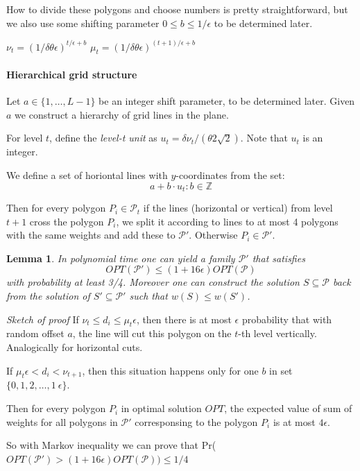 \documentclass[en]{pracamgr}
\newtheorem{lemma}{Lemma}[section]
\begin{document}
How to divide these polygons and choose numbers
is pretty straightforward,
but we also use some shifting parameter $0 \le b \le 1/\epsilon$
to be determined later.

$\nu_t = (1/\delta\theta\epsilon)^{t/\epsilon + b}$
$\mu_t = (1/\delta\theta\epsilon)^{(t+1)/\epsilon + b}$

\paragraph{Hierarchical grid structure}
Let $a \in \{1, \ldots, L - 1\}$ be an integer shift
parameter, to be determined later. Given $a$
we construct a hierarchy of grid lines in the plane.

For level $t$, define the \textit{level-t unit}
as $u_t = \delta \nu_t/(\theta 2\sqrt{2})$.
Note that $u_t$ is an integer.

We define a set of horiontal lines with $y$-coordinates
from the set:
$$a + b \cdot u_t : b \in \mathbb{Z}$$

Then for every polygon $P_i \in \mathcal{P}_t$
if the lines (horizontal or vertical)
from level $t+1$ cross the polygon $P_i$,
we split it according to lines
to at most 4 polygons with the
same weights and add these to $\mathcal{P'}$.
Otherwise $P_i \in \mathcal{P'}$.

\begin{lemma}
In polynomial time one can yield a family $\mathcal{P'}$
that satisfies $$OPT(\mathcal{P'}) \le (1+16\epsilon)OPT(\mathcal{P})$$
with probability at least 3/4.
Moreover one can construct the solution $S \subseteq \mathcal{P}$
back from the solution of $S' \subseteq \mathcal{P'}$
such that $w(S) \le w(S')$.
\end{lemma}

\textit{Sketch of proof}
If $\nu_t \le d_i \le \mu_t\epsilon$, then there is at most
$\epsilon$ probability that with random offset $a$,
the line will cut this polygon on the $t$-th level vertically.
Analogically for horizontal cuts.

If $\mu_t\epsilon < d_i < \nu_{t+1}$, then this situation happens
only for one $b$ in set $\{0, 1, 2, \ldots, 1\ \epsilon\}$.

Then for every polygon $P_i$ in optimal solution $OPT$, the expected value
of sum of weights for all polygons in $\mathcal{P'}$
corresponsing to the polygon $P_i$ is at most $4\epsilon$.

So with Markov inequality we can prove that
Pr($OPT(\mathcal{P'}) > (1+16\epsilon)OPT(\mathcal{P})) \le 1/4$
\end{document}
